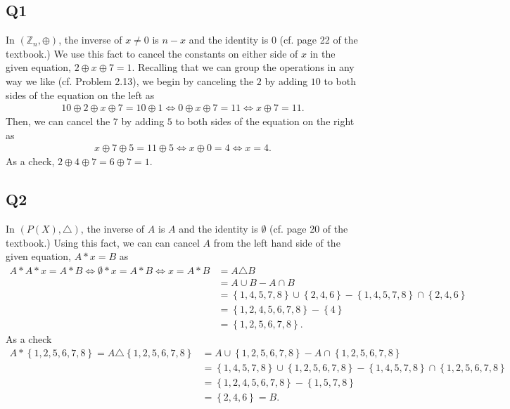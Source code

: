 \documentclass[12pt]{article}
\def\Z{{\mathbb Z}}        %
\numberwithin{theorem}{section}
\numberwithin{equation}{section}
\numberwithin{remark}{section}
\numberwithin{definition}{section}
\numberwithin{theorem}{section}
\numberwithin{lemma}{section}
\numberwithin{example}{section}
\begin{document}
\subsection{Q1}

In $(\Z_n,\oplus)$, the inverse of $x\neq0$ is $n-x$ and the identity is $0$ (cf. page 22 of the textbook.) We use this fact to cancel the constants on either side of $x$ in the given equation, $2 \oplus x \oplus 7 = 1$. Recalling that we can group the operations in any way we like (cf. Problem 2.13), we begin by canceling the $2$ by adding $10$ to both sides of the equation on the left as
\begin{align*}
	10 \oplus 2 \oplus x \oplus 7 = 10 \oplus 1 \iff 0 \oplus x \oplus 7 = 11 \iff x \oplus 7 = 11.
\end{align*}
Then, we can cancel the $7$ by adding $5$ to both sides of the equation on the right as 
\begin{align*}
	x \oplus 7 \oplus 5 = 11 \oplus 5 \iff x \oplus 0 = 4 \iff x = 4.
\end{align*}
As a check, $2 \oplus 4 \oplus 7 = 6 \oplus 7 = 1$. 



\subsection{Q2}

In $\left(P(X),\triangle\right)$, the inverse of $A$ is $A$ and the identity is $\emptyset$ (cf. page 20 of the textbook.) Using this fact, we can can cancel $A$ from the left hand side of the given equation, $A*x=B$ as
\begin{align*}
	A*A*x=A*B\iff\emptyset * x= A*B\iff x = A*B & = A \triangle B \\
	& = A \cup B - A \cap B \\
	& = \left\{1,4,5,7,8\right\}\cup\left\{2,4,6\right\} - \left\{1,4,5,7,8\right\}\cap\left\{2,4,6\right\} \\
	& = \left\{1,2,4,5,6,7,8\right\}- \left\{4\right\}\\
	& = \left\{1,2,5,6,7,8\right\}.
\end{align*}
As a check 
\begin{align*}
	A*\left\{1,2,5,6,7,8\right\} = A\triangle\left\{1,2,5,6,7,8\right\}  & = A\cup\left\{1,2,5,6,7,8\right\} - A\cap\left\{1,2,5,6,7,8\right\}\\
	& = \left\{1,4,5,7,8\right\}\cup\left\{1,2,5,6,7,8\right\} - \left\{1,4,5,7,8\right\}\cap\left\{1,2,5,6,7,8\right\}\\
	& = \left\{1,2,4,5,6,7,8\right\} - \left\{1,5,7,8\right\}\\
	& = \left\{2,4,6\right\} = B.\\
\end{align*}
\end{document}
